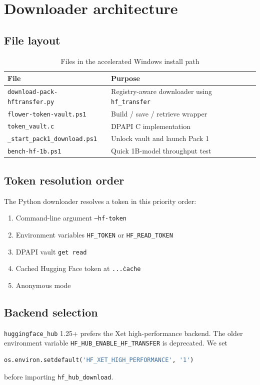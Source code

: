 \documentclass[11pt,a4paper]{article}
\begin{document}
\section{Downloader architecture}
\subsection{File layout}
\begin{table}[h]
\centering
\begin{tabular}{@{}ll@{}}
\toprule
File & Purpose \\
\midrule
\texttt{download-pack-hftransfer.py} & Registry-aware downloader using \texttt{hf\_transfer} \\
\texttt{flower-token-vault.ps1}     & Build / save / retrieve wrapper \\
\texttt{token\_vault.c}              & DPAPI C implementation \\
\texttt{\_start\_pack1\_download.ps1} & Unlock vault and launch Pack 1 \\
\texttt{bench-hf-1b.ps1}            & Quick 1B-model throughput test \\
\bottomrule
\end{tabular}
\caption{Files in the accelerated Windows install path}
\end{table}

\subsection{Token resolution order}
The Python downloader resolves a token in this priority order:
\begin{enumerate}
  \item Command-line argument \texttt{--hf-token}
  \item Environment variables \texttt{HF\_TOKEN} or \texttt{HF\_READ\_TOKEN}
  \item DPAPI vault \texttt{get read}
  \item Cached Hugging Face token at \texttt{...\.cache\huggingface\token}
  \item Anonymous mode
\end{enumerate}

\subsection{Backend selection}
\texttt{huggingface\_hub} 1.25+ prefers the Xet high-performance backend.  The older environment variable \texttt{HF\_HUB\_ENABLE\_HF\_TRANSFER} is deprecated.  We set
\begin{lstlisting}[language=Python]
os.environ.setdefault('HF_XET_HIGH_PERFORMANCE', '1')
\end{lstlisting}
before importing \texttt{hf\_hub\_download}.
\end{document}
